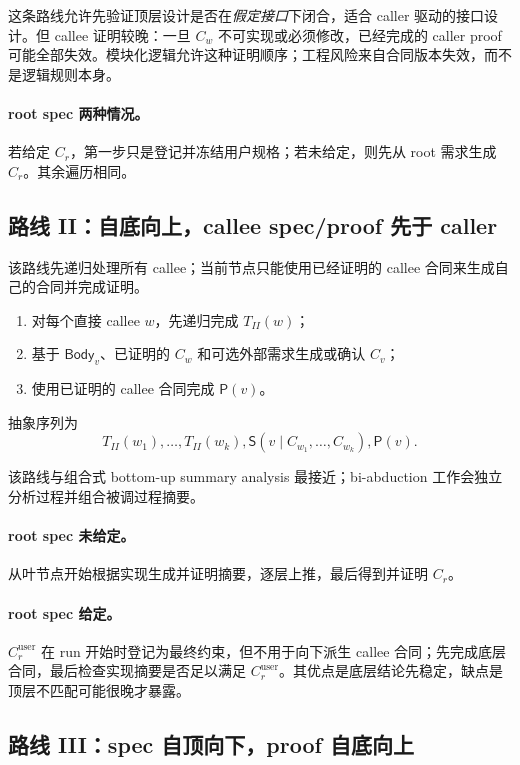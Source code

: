 \documentclass[UTF8,a4paper,11pt]{ctexart}
\newcommand{\SpecOp}{\mathsf{S}}
\newcommand{\ProofOp}{\mathsf{P}}
\newcommand{\Body}{\mathsf{Body}}
\begin{document}
这条路线允许先验证顶层设计是否在\emph{假定接口}下闭合，适合 caller 驱动的接口设计。但 callee 证明较晚：一旦 $C_w$ 不可实现或必须修改，已经完成的 caller proof 可能全部失效。模块化逻辑允许这种证明顺序；工程风险来自合同版本失效，而不是逻辑规则本身。

\paragraph{root spec 两种情况。}
若给定 $C_r$，第一步只是登记并冻结用户规格；若未给定，则先从 root 需求生成 $C_r$。其余遍历相同。

\subsection{路线 II：自底向上，callee spec/proof 先于 caller}

该路线先递归处理所有 callee；当前节点只能使用已经证明的 callee 合同来生成自己的合同并完成证明。

\begin{enumerate}[label=II\arabic*.]
  \item 对每个直接 callee $w$，先递归完成 $T_{II}(w)$；
  \item 基于 $\Body_v$、已证明的 $C_w$ 和可选外部需求生成或确认 $C_v$；
  \item 使用已证明的 callee 合同完成 $\ProofOp(v)$。
\end{enumerate}

抽象序列为
\[
  T_{II}(w_1),\ldots,T_{II}(w_k),
  \SpecOp(v\mid C_{w_1},\ldots,C_{w_k}),
  \ProofOp(v).
\]

该路线与组合式 bottom-up summary analysis 最接近；bi-abduction 工作会独立分析过程并组合被调过程摘要\cite{Calcagno2009BiAbduction}。

\paragraph{root spec 未给定。}
从叶节点开始根据实现生成并证明摘要，逐层上推，最后得到并证明 $C_r$。

\paragraph{root spec 给定。}
$C_r^{\mathrm{user}}$ 在 run 开始时登记为最终约束，但不用于向下派生 callee 合同；先完成底层合同，最后检查实现摘要是否足以满足 $C_r^{\mathrm{user}}$。其优点是底层结论先稳定，缺点是顶层不匹配可能很晚才暴露。

\subsection{路线 III：spec 自顶向下，proof 自底向上}
\end{document}
